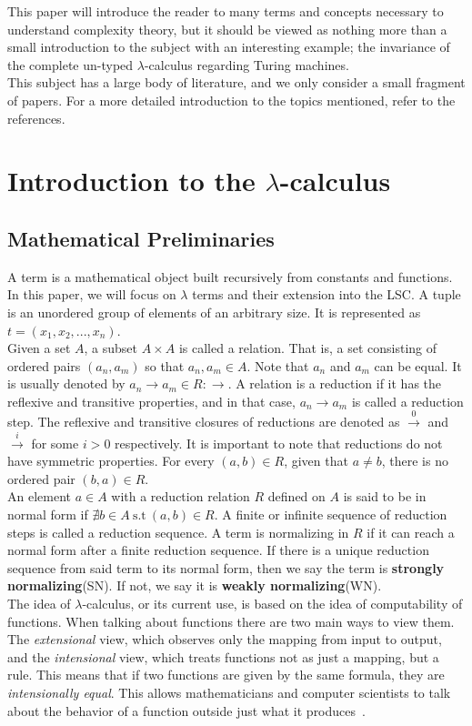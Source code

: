 \documentclass[11pt]{article}
\begin{document}
This paper will introduce the reader to many terms and concepts necessary to understand complexity theory, but it should be viewed as nothing more than a small introduction to the subject with an interesting example; the invariance of the complete un-typed $\lambda$-calculus regarding Turing machines. \\
This subject has a large body of literature, and we only consider a small fragment of papers. For a more detailed introduction to the topics mentioned, refer to the references.

\section{Introduction to the $\lambda$-calculus}\label{intro-lambda}
 \subsection{Mathematical Preliminaries}
 A term is a mathematical object built recursively from constants and functions. In this paper, we will focus on $\lambda$ terms and their extension into the LSC.
 A tuple is an unordered group of elements of an arbitrary size. It is represented as $t = (x_1,x_2,...,x_n)$. \\
 Given a set $A$, a subset $A \times A$ is called a relation. That is, a set consisting of ordered pairs $(a_n,a_m)$ so that $a_n,a_m \in A$. Note that $a_n$ and $a_m$ can be equal. It is usually denoted by $a_n \rightarrow a_m \in R : \rightarrow$. A relation is a reduction if it has the reflexive and transitive properties, and in that case, $a_n \rightarrow a_m$ is called a reduction step.
 The reflexive and transitive closures of reductions are denoted as $\xrightarrow{0}$ and $\xrightarrow{i}$ for some $i > 0$ respectively. It is important to note that reductions do not have symmetric properties. For every $(a,b) \in R$, given that $a \neq b$, there is no ordered pair $(b,a) \in R$. \\
 An element $a \in A$ with a reduction relation $R$ defined on $A$ is said to be in normal form if $\nexists b \in A \ \text{s.t} \ (a,b) \in R$.
 A finite or infinite sequence of reduction steps is called a reduction sequence.
 A term is normalizing in $R$ if it can reach a normal form after a finite reduction sequence. If there is a unique reduction sequence from said term to its normal form, then we say the term is \textbf{strongly normalizing}(SN). If not, we say it is \textbf{weakly normalizing}(WN). \\
The idea of $\lambda$-calculus, or its current use, is based on the idea of computability of functions. When talking about functions there are two main ways to view them. The \textit{extensional} view, which observes only the mapping from input to output, and the \textit{intensional} view, which treats functions not as just a mapping, but a rule. This means that if two functions are given by the same formula, they are \textit{intensionally equal}. This allows mathematicians and computer scientists to talk about the behavior of a function outside just what it produces~\cite{selinger}.
\end{document}
